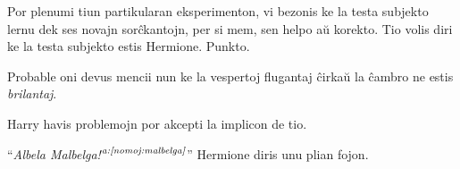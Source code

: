 Por plenumi tiun partikularan eksperimenton, vi bezonis ke la testa
subjekto lernu dek ses novajn sorĉkantojn, per si mem, sen helpo aŭ
korekto. Tio volis diri ke la testa subjekto estis Hermione. Punkto.

Probable oni devus mencii nun ke la vespertoj flugantaj ĉirkaŭ la
ĉambro ne estis \emph{brilantaj}.

Harry havis problemojn por akcepti la implicon de tio.

``\emph{Albela Malbelga!}$^{\textit{a:\ref{nomoj:malbelga}}}$''
Hermione diris unu plian fojon.









